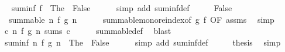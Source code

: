 \begin{isabellebody}
\ \isamarkupfalse%
\ {\isachardoublequoteopen}suminf\ f\ {\isacharequal}{\kern0pt}\ The\ {\isacharparenleft}{\kern0pt}{\isasymlambda}{\isacharunderscore}{\kern0pt}{\isachardot}{\kern0pt}\ False{\isacharparenright}{\kern0pt}{\isachardoublequoteclose}\isanewline
\ \ \ \ \isamarkupfalse%
\ {\isacharparenleft}{\kern0pt}simp\ add{\isacharcolon}{\kern0pt}\ suminf{\isacharunderscore}{\kern0pt}def{\isacharparenright}{\kern0pt}\isanewline
\ \ \isamarkupfalse%
\ \isamarkupfalse%
\ False\ \isamarkupfalse%
\ {\isachardoublequoteopen}{\isasymnot}\ summable\ {\isacharparenleft}{\kern0pt}{\isasymlambda}n{\isachardot}{\kern0pt}\ f\ {\isacharparenleft}{\kern0pt}g\ n{\isacharparenright}{\kern0pt}{\isacharparenright}{\kern0pt}{\isachardoublequoteclose}\isanewline
\ \ \ \ \isamarkupfalse%
\ summable{\isacharunderscore}{\kern0pt}mono{\isacharunderscore}{\kern0pt}reindex{\isacharbrackleft}{\kern0pt}of\ g\ f{\isacharcomma}{\kern0pt}\ OF\ assms{\isacharbrackright}{\kern0pt}\ \isamarkupfalse%
\ simp\isanewline
\ \ \isamarkupfalse%
\ \isamarkupfalse%
\ {\isachardoublequoteopen}{\isasymnot}{\isacharparenleft}{\kern0pt}{\isasymexists}c{\isachardot}{\kern0pt}\ {\isacharparenleft}{\kern0pt}{\isasymlambda}n{\isachardot}{\kern0pt}\ f\ {\isacharparenleft}{\kern0pt}g\ n{\isacharparenright}{\kern0pt}{\isacharparenright}{\kern0pt}\ sums\ c{\isacharparenright}{\kern0pt}{\isachardoublequoteclose}\isanewline
\ \ \ \ \isamarkupfalse%
\ summable{\isacharunderscore}{\kern0pt}def\ \isamarkupfalse%
\ blast\isanewline
\ \ \isamarkupfalse%
\ \isamarkupfalse%
\ {\isachardoublequoteopen}suminf\ {\isacharparenleft}{\kern0pt}{\isasymlambda}n{\isachardot}{\kern0pt}\ f\ {\isacharparenleft}{\kern0pt}g\ n{\isacharparenright}{\kern0pt}{\isacharparenright}{\kern0pt}\ {\isacharequal}{\kern0pt}\ The\ {\isacharparenleft}{\kern0pt}{\isasymlambda}{\isacharunderscore}{\kern0pt}{\isachardot}{\kern0pt}\ False{\isacharparenright}{\kern0pt}{\isachardoublequoteclose}\isanewline
\ \ \ \ \isamarkupfalse%
\ {\isacharparenleft}{\kern0pt}simp\ add{\isacharcolon}{\kern0pt}\ suminf{\isacharunderscore}{\kern0pt}def{\isacharparenright}{\kern0pt}\isanewline
\ \ \isamarkupfalse%
\ \isamarkupfalse%
\ {\isacharquery}{\kern0pt}thesis\ \isamarkupfalse%
\ simp\isanewline
{}\isamarkupfalse%
%
\endisatagproof
{\isafoldproof}%
%
\isadelimproof

\end{isabellebody}
